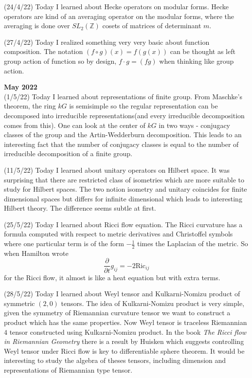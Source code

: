 \documentclass[12pt,a4paper]{article}
\newcommand{\Z}{\mathbb{Z}}
\newcommand{\dt}{\frac{\partial}{\partial t}}
\begin{document}
	(24/4/22) Today I learned about Hecke operators on modular forms. Hecke operators are kind of an averaging operator on the modular forms, where the averaging is done over $SL_2(\Z)$ cosets of matrices of determinant $m$. 
	
	(27/4/22) Today I realized something very very basic about function composition. The notation $(f \circ g)(x) =f(g(x))$ can be thought as left group action of function so by design, $f \cdot g = (fg)$ when thinking like group action. \\
	
	\maketitle\textbf{May 2022}
	\\
	
	(1/5/22) Today I learned about representations of finite group. From Maschke's theorem, the ring $kG$ is semisimple so the regular representation can be decomposed into irreducible representations(and every irreducible decomposition comes from this). %
	One can look at the center of $kG$ in two ways - conjugacy classes of the group and the Artin-Wedderburn decomposition. This leads to an interesting fact that the number of conjugacy classes is equal to the number of irreducible decomposition of a finite group.
	
	(11/5/22) Today I learned about unitary operators on Hilbert space. It was surprising that there are restricted class of isometries which are more suitable to study for Hilbert spaces. The two notion isometry and unitary coincides for finite dimensional spaces but differs for infinite dimensional which leads to interesting Hilbert theory. The difference seems subtle at first.
	
	(25/5/22) Today I learned about Ricci flow equation. The Ricci curvature has a formula computed with respect to metric derivatives and Christoffel symbols where one particular term is of the form $-\frac{1}{2}$ times the Laplacian of the metric. So when Hamilton wrote 
	\[ \dt g_{ij} = -2\text{Ric}_{ij} \]
	for the Ricci flow, it almost is like a heat equation but with extra terms.
	
	(28/5/22) Today I learned about Weyl tensor and Kulkarni-Nomizu product of symmetric $(2,0)$ tensors. The idea of Kulkarni-Nomizu product is very simple, given the symmetry of Riemannian curvature tensor we want to construct a product which has the same properties. Now Weyl tensor is traceless Riemannian $4$ tensor constructed using Kulkarni-Nomizu product. In the book \textit{The Ricci flow in Riemannian Geometry} there is a result by Huisken which suggests controlling Weyl tensor under Ricci flow is key to differentiable sphere theorem. It would be interesting to study the algebra of theses tensors, including dimension and representations of Riemannian type tensor.
	
\end{document}
